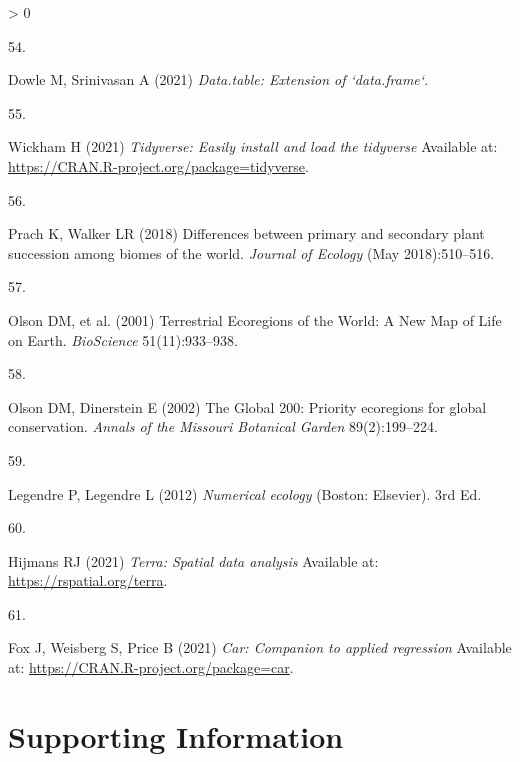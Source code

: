 \documentclass[9pt,twocolumn,twoside,lineno]{pnas-new}
\newlength{\csllabelwidth}
\newlength{\cslhangindent}
\newenvironment{CSLReferences}[2] %
 {%
  \setlength{\parindent}{0pt}
  \ifodd #1 \everypar{\setlength{\hangindent}{\cslhangindent}}\ignorespaces\fi
  \ifnum #2 > 0
  \setlength{\parskip}{#2\baselineskip}
  \fi
 }%
 {}
\newcommand{\CSLLeftMargin}[1]{\parbox[t]{\csllabelwidth}{#1}}
\newcommand{\CSLRightInline}[1]{\parbox[t]{\linewidth - \csllabelwidth}{#1}\break}
\begin{document}
\begin{CSLReferences}{0}{0}
\leavevmode\hypertarget{ref-R-data.table}{}%
\CSLLeftMargin{54. }
\CSLRightInline{Dowle M, Srinivasan A (2021) \emph{Data.table: Extension of `data.frame`}.}

\leavevmode\hypertarget{ref-R-tidyverse}{}%
\CSLLeftMargin{55. }
\CSLRightInline{Wickham H (2021) \emph{Tidyverse: Easily install and load the tidyverse} Available at: \url{https://CRAN.R-project.org/package=tidyverse}.}

\leavevmode\hypertarget{ref-Prach2018}{}%
\CSLLeftMargin{56. }
\CSLRightInline{Prach K, Walker LR (2018) {Differences between primary and secondary plant succession among biomes of the world}. \emph{Journal of Ecology} (May 2018):510--516.}

\leavevmode\hypertarget{ref-Olson2001}{}%
\CSLLeftMargin{57. }
\CSLRightInline{Olson DM, et al. (2001) {Terrestrial Ecoregions of the World: A New Map of Life on Earth}. \emph{BioScience} 51(11):933--938.}

\leavevmode\hypertarget{ref-Olson2002}{}%
\CSLLeftMargin{58. }
\CSLRightInline{Olson DM, Dinerstein E (2002) {The Global 200: Priority ecoregions for global conservation}. \emph{Annals of the Missouri Botanical Garden} 89(2):199--224.}

\leavevmode\hypertarget{ref-Legendre2012}{}%
\CSLLeftMargin{59. }
\CSLRightInline{Legendre P, Legendre L (2012) \emph{{Numerical ecology}} (Boston: Elsevier). 3rd Ed.}

\leavevmode\hypertarget{ref-R-terra}{}%
\CSLLeftMargin{60. }
\CSLRightInline{Hijmans RJ (2021) \emph{Terra: Spatial data analysis} Available at: \url{https://rspatial.org/terra}.}

\leavevmode\hypertarget{ref-R-car}{}%
\CSLLeftMargin{61. }
\CSLRightInline{Fox J, Weisberg S, Price B (2021) \emph{Car: Companion to applied regression} Available at: \url{https://CRAN.R-project.org/package=car}.}

\end{CSLReferences}

\newpage

\setcounter{figure}{0} \setcounter{section}{0} \setcounter{table}{0} \setcounter{equation}{0} \renewcommand{\thefigure}{S\arabic{figure}} \renewcommand{\thesection}{S\arabic{section}} \renewcommand{\thetable}{S\arabic{table}} \renewcommand\theequation{S\arabic{equation}}

\onecolumn

\hypertarget{supporting-information}{%
\section{Supporting Information}\label{supporting-information}}
\end{document}
